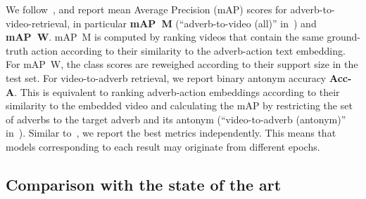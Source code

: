 \documentclass[table]{bmvc2k}
\begin{document}
We follow~\cite{moltisanti2023learning}, and report mean Average Precision (mAP) scores for adverb-to-video-retrieval, in particular \textbf{mAP~M} (``adverb-to-video (all)'' in~\cite{doughty_action_2020}) and \textbf{mAP~W}. mAP~M is computed by ranking videos that contain the same ground-truth action according to their similarity to the adverb-action text embedding.
For mAP~W, the class scores are reweighed according to their support size in the test set. 
For video-to-adverb retrieval, we report binary antonym accuracy \textbf{Acc-A}. This is equivalent to ranking adverb-action embeddings according to their similarity to the embedded video and calculating the mAP by restricting the set of adverbs to the target adverb and its antonym (``video-to-adverb (antonym)'' in~\cite{doughty_action_2020}).
Similar to~\cite{moltisanti2023learning}, we report the best metrics independently. This means that models corresponding to each result may originate from different epochs.


\subsection{Comparison with the state of the art} \label{sota_comparison}
\end{document}
